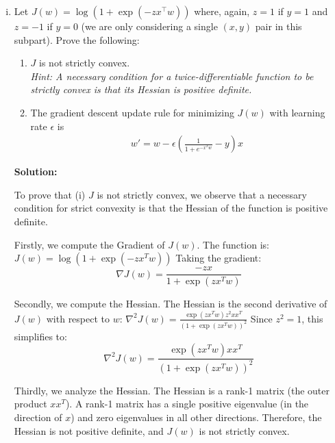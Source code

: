 \documentclass{article}
\newenvironment{solution}{\color{blue} \smallskip \textbf{Solution:}}{}
\begin{document}
\begin{enumerate}[(a)]
\begin{enumerate}[(i)]
\begin{solution}
Thus, the cross-entropy loss is equivalent to the logistic loss:
\[
\sum_{i=1}^{n} H(\text{Ber}(y_i), \text{Ber}(s(x_i^T w))) = \sum_{i=1}^{n} \log(1 + \exp(-z_i x_i^T w))
\]
Thus, equation (1) and equation (2) are equivalent.

        \end{solution}

        \item Let $J(w) = \log(1+\exp(-zx^\top w))$ where, again, $z = 1$ if $y = 1$ and $z = -1$ if $y = 0$ (we are only considering a single $(x, y)$ pair in this subpart). Prove the following:
        \begin{enumerate}
            \item $J$ is not strictly convex. \\
            \emph{Hint: A necessary condition for a twice-differentiable function to be strictly convex is that its Hessian is positive definite.}
            \item The gradient descent update rule for minimizing $J(w)$ with learning rate $\epsilon$ is 
            \begin{align*}
                w' = w - \epsilon\left(\frac{1}{1 + e^{-x^{T}w}} - y\right)x
            \end{align*}
        \end{enumerate}

        \begin{solution}


To prove that (i) \( J \) is not strictly convex, we observe that a necessary condition for strict convexity is that the Hessian of the function is positive definite.

Firstly, we compute the Gradient of \( J(w) \).
The function is:
\(
J(w) = \log(1 + \exp(-z x^T w))
\)
Taking the gradient:
\[
\nabla J(w) = \frac{-z x}{1 + \exp(z x^T w)}
\]

Secondly, we compute the Hessian. The Hessian is the second derivative of \( J(w) \) with respect to \( w \):
\(
\nabla^2 J(w) = \frac{\exp(z x^T w) z^2 x x^T}{(1 + \exp(z x^T w))^2}
\)
Since \( z^2 = 1 \), this simplifies to:
\[
\nabla^2 J(w) = \frac{\exp(z x^T w) x x^T}{(1 + \exp(z x^T w))^2}
\]

Thirdly, we analyze the Hessian. The Hessian is a rank-1 matrix (the outer product \( x x^T \)). A rank-1 matrix has a single positive eigenvalue (in the direction of \( x \)) and zero eigenvalues in all other directions. Therefore, the Hessian is not positive definite, and \( J(w) \) is not strictly convex.\\\\



\end{solution}
\end{enumerate}
\end{enumerate}
\end{document}
